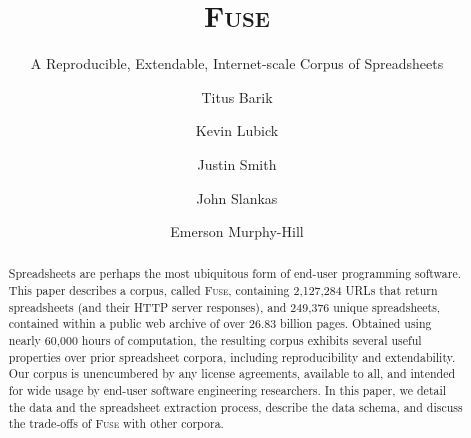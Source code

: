 \documentclass{svjour3}
\newcommand{\urlcount}{2,127,284}
\newcommand{\xlscount}{249,376}
\begin{document}
\title{\textsc{Fuse}}

\subtitle{A Reproducible, Extendable, Internet-scale Corpus of Spreadsheets}


\author{Titus Barik         \and
        Kevin Lubick \and
        Justin Smith \and
        John Slankas \and
        Emerson Murphy-Hill
}



\maketitle

\begin{abstract}
Spreadsheets are perhaps the most ubiquitous form of end-user programming software. This paper describes a corpus, called \textsc{Fuse}, containing 
\urlcount{} URLs that return spreadsheets (and their HTTP server responses), and \xlscount{} unique spreadsheets, contained within a public web archive of over 26.83 billion pages. Obtained using nearly 60,000 hours of computation, the resulting corpus exhibits several useful properties over prior spreadsheet corpora, including reproducibility and extendability. Our corpus is unencumbered by any license agreements, available to all, and intended for wide usage by end-user software engineering researchers. In this paper, we detail the data and the spreadsheet extraction process, describe the data schema, and discuss the trade-offs of \textsc{Fuse} with other corpora.
\end{abstract}
\end{document}

